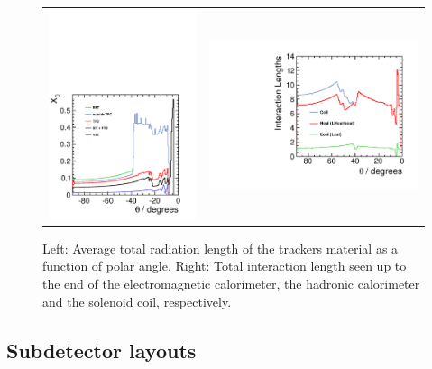 \begin{figure}[t!]
\begin{tabular}{cc}
\includegraphics[width=0.52\hsize,viewport={0 -10 600 500},clip]{Detector/fig/material-budget-new.pdf} &
\includegraphics[width=0.5\hsize]{Detector/fig/intlen_ILD_o1_v05.pdf}
\end{tabular}
\caption[Material in the ILD detector]{Left: Average total radiation length of the trackers material as a function of polar angle. Right: Total interaction length seen up to the end of the electromagnetic calorimeter, the hadronic calorimeter and the solenoid coil, respectively.}
\label{fig:det:material}

\end{figure}

\vspace{2cm}
\subsection{Subdetector layouts}

